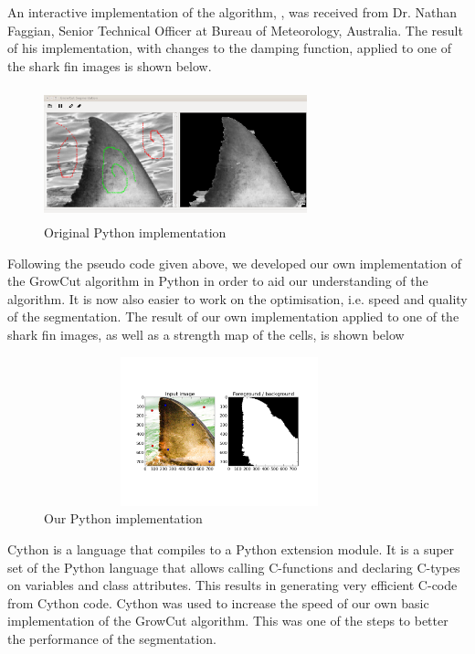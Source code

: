 \documentclass[a4paper,10pt]{article}
\begin{document}
\noindent An interactive implementation of the algorithm, \cite{growcut}, was
received from Dr. Nathan Faggian, Senior Technical Officer at Bureau of
Meteorology, Australia.  The result of his implementation, with changes to the
damping function, applied to one of the shark fin images is shown below. 
\begin{figure}[H]
 \centering
 \includegraphics[width=3in, height=1.5in]{haaim}
 \caption{Original Python implementation}
 \label{fin}
\end{figure}    


\noindent Following the pseudo code given above, we developed our own
implementation of the GrowCut algorithm in Python in order to aid our
understanding of the algorithm.  It is now also easier to work on the
optimisation, i.e. speed and quality of the segmentation.  The result of our
own implementation applied to one of the shark fin images, as well as a strength
map of the cells, is shown below
\begin{figure}[H]
 \centering
 \includegraphics[width=4in, height=1.7in]{demo1.png}
 \caption{Our Python implementation}
\end{figure}   


\noindent Cython \cite{cython} is a language that compiles to a Python extension
module.  It is a super set of the Python language that allows calling
C-functions and declaring C-types on variables and class attributes.  This
results in generating very efficient C-code from Cython code.  Cython was used
to increase the speed of our own basic implementation of the GrowCut algorithm. 
This was one of the steps to better the performance of the segmentation.  \\     
\end{document}
